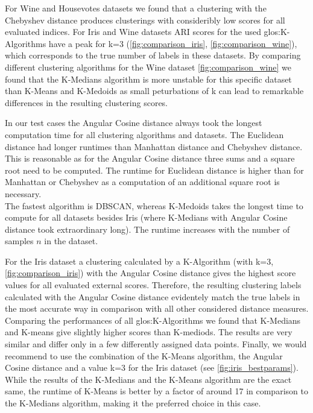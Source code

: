 


For Wine and Housevotes datasets we found that a clustering with the Chebyshev distance produces clusterings with consideribly low scores for all evaluated indices. 
For Iris and Wine datasets ARI scores for the used \Gls{glos:K-Algorithms} have a peak for k=3 (\autoref{fig:comparison_iris}, \autoref{fig:comparison_wine}), which corresponds to the true number of labels in these datasets.  
By comparing different clustering algorithms for the Wine dataset \autoref{fig:comparison_wine} we found that the K-Medians algorithm is more unstable for this specific dataset than K-Means and K-Medoids as small peturbations of k can lead to remarkable differences in the resulting clustering scores. 

In our test cases the Angular Cosine distance always took the longest computation time for all clustering algorithms and datasets. The Euclidean distance had longer runtimes than Manhattan distance and Chebyshev distance. This is reasonable as for the Angular Cosine distance three sums and a square root need to be computed. The runtime for Euclidean distance is higher than for Manhattan or Chebyshev as a computation of an additional square root is necessary.\\
The fastest algorithm is DBSCAN, whereas K-Medoids takes the longest time to compute for all datasets besides Iris (where K-Medians with Angular Cosine distance took extraordinary long). The runtime increases with the number of samples $n$ in the dataset. 

For the Iris dataset a clustering calculated by a K-Algorithm (with k=3, \autoref{fig:comparison_iris}) with the Angular Cosine distance gives the highest score values for all evaluated external scores. Therefore, the resulting clustering labels calculated with the Angular Cosine distance evidentely match the true labels in the most accurate way in comparison with all other considered distance measures. Comparing the performances of all \Gls{glos:K-Algorithms} we found that K-Medians and K-means give slightly higher scores than K-mediods. The results are very similar and differ only in a few differently assigned data points.
Finally, we would recommend to use the combination of the K-Means algorithm, the Angular Cosine distance and a value k=3 for the Iris dataset (see \autoref{fig:iris_bestparams}). While the results of the K-Medians and the K-Means algorithm are the exact same, the runtime of K-Means is better by a factor of around 17 in comparison to the K-Medians algorithm, making it the preferred choice in this case. \\

